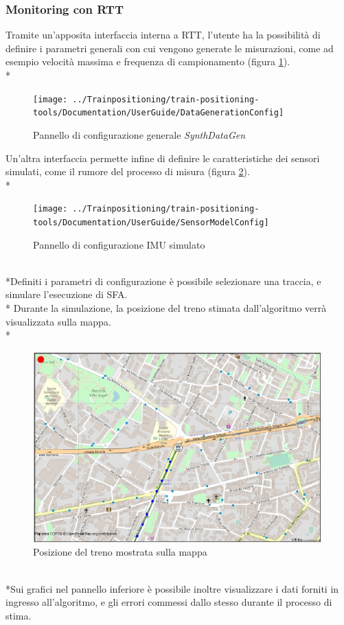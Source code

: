 \subsubsection{Monitoring con RTT}
Tramite un'apposita interfaccia interna a RTT, l'utente ha la possibilit\`a di definire i parametri generali con cui vengono generate le misurazioni, come ad esempio velocit\`a massima e frequenza di campionamento (figura \ref{fig:datagenerationconfig}).\\*
\begin{figure}[h]
	\centering
	\texttt{[image: ../Trainpositioning/train-positioning-tools/Documentation/UserGuide/DataGenerationConfig]}
	\caption{Pannello di configurazione generale \emph{SynthDataGen}}
	\label{fig:datagenerationconfig}
\end{figure}\newpage
Un'altra interfaccia permette infine di definire le caratteristiche dei sensori simulati, come il rumore del processo di misura (figura \ref{fig:imuconfig}).\\*
\begin{figure}[h]
	\centering
	\texttt{[image: ../Trainpositioning/train-positioning-tools/Documentation/UserGuide/SensorModelConfig]}
	\caption{Pannello di configurazione IMU simulato}
	\label{fig:imuconfig}
\end{figure}
\\*Definiti i parametri di configurazione \`e possibile selezionare una traccia, e simulare l'esecuzione di SFA.\\* Durante la simulazione, la posizione del treno stimata dall'algoritmo verr\`a visualizzata sulla mappa.\\*
\begin{figure}[h]
	\centering
	\includegraphics[width=0.7\linewidth]{img/trainmap}
	\caption{Posizione del treno mostrata sulla mappa}
	\label{fig:trainonmap}
\end{figure}
\\*Sui grafici nel pannello inferiore \`e possibile inoltre visualizzare i dati forniti in ingresso all'algoritmo, e gli errori commessi dallo stesso durante il processo di stima.\newpage
